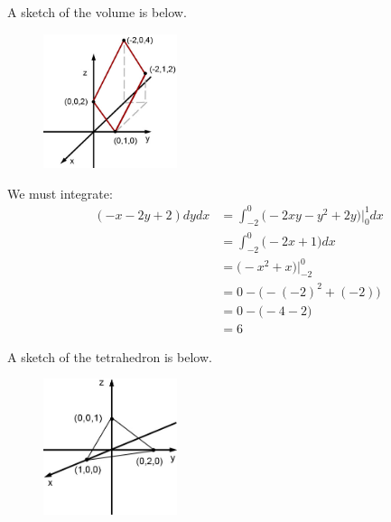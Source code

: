 \documentclass{article}
\begin{document}
\BEN
\item %
\BEN
\item A sketch of the volume is below. 
\begin{figure}[h]
  \vspace{-1pt}
  \begin{center}
    \includegraphics[width=0.35\textwidth]{WA06Solid.jpg}
  \end{center}
\end{figure}
\item We must integrate:
\begin{align*}
  \mathop{\int_{-2}^0 \! \int_0^1} (-x-2y+2 ) dydx 
  &= \int_{-2}^0 \big( -2xy -y^2 + 2y \big) \big|_0^1 dx \\
  &= \int_{-2}^0 \Big( -2x + 1  \Big) dx \\
  &= \Big(-x^2 + x \Big) \Big|_{-2}^0  \\  
  &= 0- \big(- (-2)^2 + (-2)\big)\\
  &= 0- \big(- 4 -2\big)\\
  &= 6
\end{align*}
\EEN
\item %
\BEN
\item A sketch of the tetrahedron is below. 
\begin{figure}[h]
  \vspace{-1pt}
  \begin{center}
    \includegraphics[width=0.35\textwidth]{WA06TetExample.jpg}
  \end{center}
\end{figure}
\end{document}
